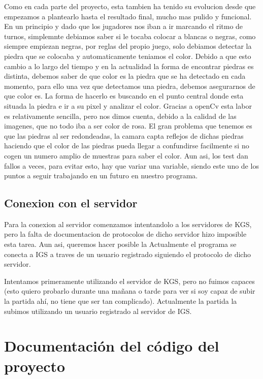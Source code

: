 \documentclass[12pt,a4paper]{report}
\begin{document}
Como en cada parte del proyecto, esta tambien ha tenido su evolucion desde que empezamos a plantearlo hasta el resultado final, mucho mas pulido y funcional. En un principio y dado que los jugadores nos iban a ir marcando el ritmo de turnos, simplemnte debiamos saber si le tocaba colocar a blancas o negras, como siempre empiezan negras, por reglas del propio juego, solo debiamos detectar la piedra que se colocaba y automaticamente teniamos el color.
Debido a que esto cambio a lo largo del tiempo y en la actualidad la forma de encontrar piedras es distinta, debemos saber de que color es la piedra que se ha detectado en cada momento, para ello una vez que detectamos una piedra, debemos asegurarnos de que color es. La forma de hacerlo es buscando en el punto central donde esta situada la piedra e ir a su pixel y analizar el color. Gracias a openCv esta labor es relativamente sencilla, pero nos dimos cuenta, debido a la calidad de las imagenes, que no todo iba a ser color de rosa. El gran problema que tenemos es que las piedras al ser redondeadas, la camara capta reflejos de dichas piedras haciendo que el color de las piedras pueda llegar a confundirse facilmente si no cogen un numero amplio de muestras para saber el color. Aun asi, los test dan fallos a veces, para evitar esto, hay que variar una variable, siendo este uno de los puntos a seguir trabajando en un futuro en nuestro programa.

\section{Conexion con el servidor}

Para la conexion al servidor comenzamos intentandolo a los servidores de KGS, pero la falta de documentacion de protocolos de dicho servidor hizo imposible esta tarea. Aun asi, queremos hacer posible la  Actualmente el programa se conecta a IGS a traves de un usuario registrado siguiendo el protocolo de dicho servidor. 


Intentamos primeramente utilizando el servidor de KGS, pero no fuimos capaces (esto quiero probarlo durante una mañana o tarde para ver si soy capaz de subir la partida ahí, no tiene que ser tan complicado).
Actualmente la partida la subimos utilizando un usuario registrado al servidor de IGS. 


\chapter{Documentación del código del proyecto}
\end{document}
